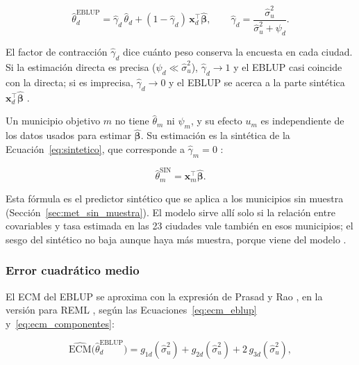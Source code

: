 \begin{equation}
    \hat{\theta}_d^{\text{EBLUP}} = \hat{\gamma}_d\, \hat{\theta}_d + (1 - \hat{\gamma}_d)\, \mathbf{x}_d^\top \hat{\boldsymbol{\beta}}, \qquad \hat{\gamma}_d = \frac{\hat{\sigma}_u^2}{\hat{\sigma}_u^2 + \psi_d} .
    \label{eq:eblup_a}
\end{equation}

El factor de contracción $\hat{\gamma}_d$ dice cuánto peso conserva la encuesta en cada ciudad. Si la estimación directa es precisa ($\psi_d \ll \hat{\sigma}_u^2$), $\hat{\gamma}_d \to 1$ y el EBLUP casi coincide con la directa; si es imprecisa, $\hat{\gamma}_d \to 0$ y el EBLUP se acerca a la parte sintética $\mathbf{x}_d^\top\hat{\boldsymbol{\beta}}$ \cite[p.~427]{morales2021smallarea}.

Un municipio objetivo $m$ no tiene $\hat{\theta}_m$ ni $\psi_m$, y su efecto $u_m$ es independiente de los datos usados para estimar $\hat{\boldsymbol{\beta}}$. Su estimación es la sintética de la Ecuación~\ref{eq:sintetico}, que corresponde a $\hat{\gamma}_m = 0$ \cite[p.~441]{morales2021smallarea}:

\begin{equation}
    \hat{\theta}_m^{\text{SIN}} = \mathbf{x}_m^\top \hat{\boldsymbol{\beta}} .
    \label{eq:sintetico}
\end{equation}

Esta fórmula es el predictor sintético que se aplica a los municipios sin muestra (Sección~\ref{sec:met_sin_muestra}). El modelo sirve allí solo si la relación entre covariables y tasa estimada en las 23 ciudades vale también en esos municipios; el sesgo del sintético no baja aunque haya más muestra, porque viene del modelo \cite[p.~37]{Molina2019}.

\subsubsection{Error cuadrático medio}

El ECM del EBLUP se aproxima con la expresión de Prasad y Rao \cite{PrasadRao1990}, en la versión para REML \cite[pp.~440--441]{morales2021smallarea}, según las Ecuaciones~\ref{eq:ecm_eblup} y~\ref{eq:ecm_componentes}:

\begin{equation}
    \widehat{\text{ECM}}\big(\hat{\theta}_d^{\text{EBLUP}}\big) = g_{1d}(\hat{\sigma}_u^2) + g_{2d}(\hat{\sigma}_u^2) + 2\,g_{3d}(\hat{\sigma}_u^2),
    \label{eq:ecm_eblup}
\end{equation}

